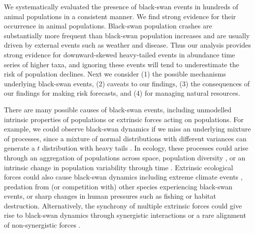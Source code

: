 We systematically evaluated the presence of black-swan events in hundreds of
animal populations in a consistent manner. 
We find strong evidence for their occurrence in animal populations. Black-swan
population crashes are substantially more frequent
than black-swan population
increases and are usually driven by external events such as weather and
disease.
Thus our analysis provides strong evidence
for downward-skewed heavy-tailed events in abundance time series of higher
taxa, and ignoring these events will tend to underestimate the risk of
population declines.
Next we consider 
(1) the possible mechanisms underlying black-swan events, 
(2) caveats to our findings, 
(3) the consequences of our findings for making risk forecasts, and 
(4) for managing natural resources. 


There are many possible causes of black-swan events, including
unmodelled intrinsic properties of populations or extrinsic forces acting on
populations. For example, we could observe black-swan dynamics if we miss an
underlying mixture of processes, since a mixture of normal distributions with
different variances can generate a $t$ distribution with heavy
tails \citep{gelman2014}. In ecology, these processes could arise through an
aggregation of populations across space, population
diversity \citep{schindler2010}, or an intrinsic change in population variability
through time \citep{carpenter2006}. Extrinsic ecological forces could also cause
black-swan dynamics \citep{nunez2012} including extreme climate
events \citep{meehl2004, katz2005, ipcc2012}, predation from (or competition
with) other species experiencing black-swan events, or sharp changes in human
pressures such as fishing or habitat destruction. Alternatively, the
synchrony of multiple extrinsic forces could give rise to black-swan dynamics
through synergistic interactions \citep{kirby2009} or a rare alignment of
non-synergistic forces \citep{denny2009}.

